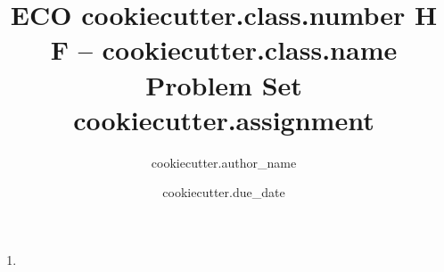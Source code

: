 \documentclass{article}
\title{ECO{{ cookiecutter.class.number }} H F -- {{ cookiecutter.class.name }} \\Problem Set {{ cookiecutter.assignment }}}
\author{ {{cookiecutter.author_name}} }
\date{ {{ cookiecutter.due_date }} }
\begin{document}
\maketitle

\begin{problem}

\end{problem}

\begin{solution}

\end{solution}

\begin{problem}

\end{problem}

\begin{enumerate}
    \item \textit{}
    \begin{solution}
    
    \end{solution}
\end{enumerate}
\end{document}
